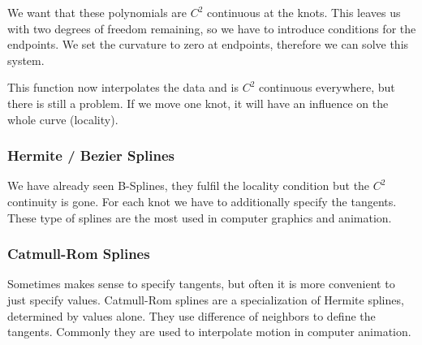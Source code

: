 We want that these polynomials are $C^2$ continuous at the knots. This leaves us with two degrees of freedom remaining, so we have to introduce conditions for the endpoints. We set the curvature to zero at endpoints, therefore we can solve this system. \medskip

This function now interpolates the data and is $C^2$ continuous everywhere, but there is still a problem. If we move one knot, it will have an influence on the whole curve (locality).

\subsubsection{Hermite / Bezier Splines}

We have already seen B-Splines, they fulfil the locality condition but the $C^2$ continuity is gone. For each knot we have to additionally specify the tangents. These type of splines are the most used in computer graphics and animation.

\subsubsection{Catmull-Rom Splines}

Sometimes makes sense to specify tangents, but often it is more convenient to just specify values. Catmull-Rom splines are a specialization of Hermite splines, determined by values alone. They use difference of neighbors to define the tangents. Commonly they are used to interpolate motion in computer animation.
